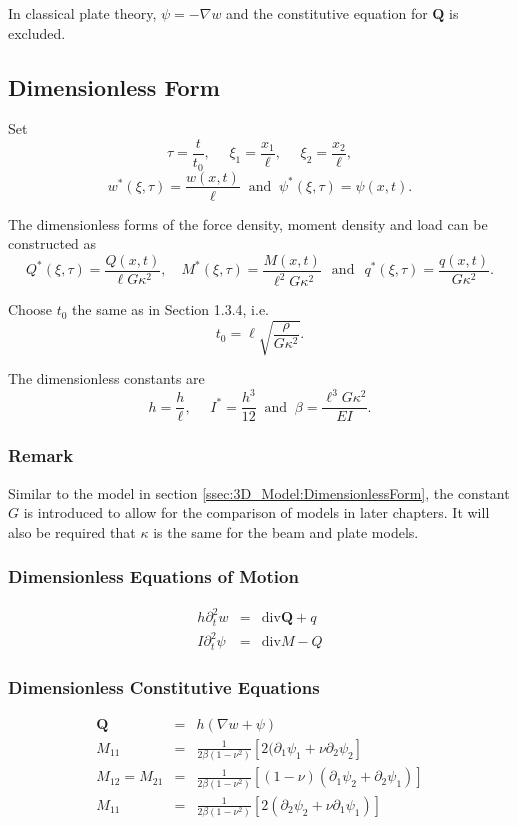 \documentclass[../../main.tex]{subfiles}
\begin{document}
	In classical plate theory, $\psi = -\nabla w$ and the constitutive equation for $\mathbf{Q}$ is excluded.
	
	\subsection{Dimensionless Form}\label{ssec:P_Model:DimensionlessForm}
	
	Set
	\[\tau = \frac{t}{t_0}, \,\, \quad \xi_1 = \frac{x_1}{\ell}, \,\, \quad \xi_2 = \frac{x_2}{\ell},\] 
	\[w^*(\xi,\tau) = \frac{w(x,t)}{\ell} \ \text{ and } \ {\psi}^*(\xi, \tau) = {\psi}(x,t).\]
	
	The dimensionless forms of the force density, moment density and load can be constructed as \[ Q^{*}(\xi,\tau) = \frac{Q(x,t)}{\ell G\kappa^2}, \quad M^{*}(\xi,\tau) = \frac{M(x,t)}{\ell^2 G\kappa^2} \,\,\, \ \text{and} \ \,\,\, q^*(\xi,\tau) = \frac{q(x,t)}{G\kappa^2}.\]
	
	Choose $t_0$ the same as in Section 1.3.4, i.e. \[t_0 = \ell\sqrt{\frac{\rho}{G\kappa^2}}.\]
	
	The dimensionless constants are
	\[h = \frac{h}{\ell}, \,\, \quad I^* = \frac{h^3}{12} \ \text{ and } \  \beta = \frac{\ell^3G\kappa^2}{EI}.\]
	
	\subsubsection{Remark}
	Similar to the model in section \ref{ssec:3D_Model:DimensionlessForm}, the constant $G$ is introduced to allow for the comparison of models in later chapters. It will also be required that $\kappa$ is the same for the beam and plate models.
	
	\subsubsection{Dimensionless Equations of Motion}\label{sssec:P_Model:EquationsOfMotionD}
	\begin{eqnarray}
		h \partial_t^2 w & = & \textrm{div} \mathbf{Q} + q \label{eq:P_Model:EM1D} \\
		I \partial_t^2 {\psi} & = & \textrm{div} M - Q \label{eq:P_Model:EM2D_chap1}
	\end{eqnarray}
	\subsubsection{Dimensionless Constitutive Equations}\label{sssec:P_Model:ConstitutiveEquationsD}
	\begin{eqnarray}
		\mathbf{Q} & = & h(\nabla w + \psi) \label{eq:P_Model:CE1D}\\
		M_{11} & = & \frac{1}{2\beta(1-\nu^2)} \left[ 2(\partial_1\psi_1 + \nu \partial_2 \psi_2 \right] \label{eq:P_Model:CE2D}\\
		M_{12} = M_{21} & = & \frac{1}{2\beta(1-\nu^2)} \left[ (1-\nu)(\partial_1\psi_2 + \partial_2 \psi_1) \right] \label{eq:P_Model:CE3D}\\
		M_{11} & = & \frac{1}{2\beta(1-\nu^2)} \left[ 2(\partial_2 \psi_2 + \nu \partial_1 \psi_1)\right] \label{eq:P_Model:CE4D_chap1}
	\end{eqnarray}
\end{document}
